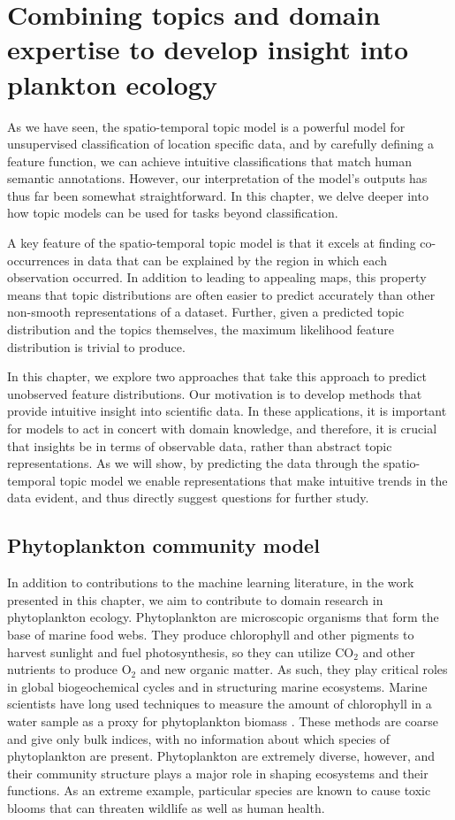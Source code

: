 
\chapter{Combining topics and domain expertise to develop insight into plankton ecology} \label{ch:plankton}

As we have seen, the spatio-temporal topic model is a powerful model for unsupervised classification of location specific data, and by carefully defining a feature function, we can achieve intuitive classifications that match human semantic annotations. However, our interpretation of the model's outputs has thus far been somewhat straightforward. In this chapter, we delve deeper into how topic models can be used for tasks beyond classification.

A key feature of the spatio-temporal topic model is that it excels at finding co-occurrences in data that can be explained by the region in which each observation occurred. In addition to leading to appealing maps, this property means that topic distributions are often easier to predict accurately than other non-smooth representations of a dataset. Further, given a predicted topic distribution and the topics themselves, the maximum likelihood feature distribution is trivial to produce.

In this chapter, we explore two approaches that take this approach to predict unobserved feature distributions. Our motivation is to develop methods that provide intuitive insight into scientific data. In these applications, it is important for models to act in concert with domain knowledge, and therefore, it is crucial that insights be in terms of observable data, rather than abstract topic representations. As we will show, by predicting the data through the spatio-temporal topic model we enable representations that make intuitive trends in the data evident, and thus directly suggest questions for further study.

\section{Phytoplankton community model}
In addition to contributions to the machine learning literature, in the work presented in this chapter, we aim to contribute to domain research in phytoplankton ecology. Phytoplankton are microscopic organisms that form the base of marine food webs. They produce chlorophyll and other pigments to harvest sunlight and fuel photosynthesis, so they can utilize $\mathrm{CO}_2$ and other nutrients to produce $\mathrm{O}_2$ and new organic matter. As such, they play critical roles in global biogeochemical cycles and in structuring marine ecosystems.  
Marine scientists have long used techniques to measure the amount of chlorophyll in a water sample as a proxy for phytoplankton biomass \citep{Lorenzen1966}. These methods are coarse and give only bulk indices, with no information about which species of phytoplankton are present. Phytoplankton are extremely diverse, however, and their community structure plays a major role in shaping ecosystems and their functions. As an extreme example, particular species are known to cause toxic blooms that can threaten wildlife as well as human health.

